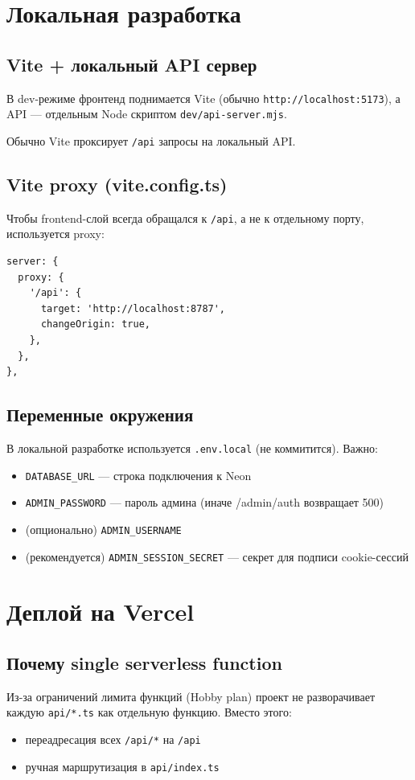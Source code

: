 \documentclass[12pt,a4paper]{article}
\begin{document}
\section{Локальная разработка}
\subsection{Vite + локальный API сервер}
В dev-режиме фронтенд поднимается Vite (обычно \texttt{http://localhost:5173}), а API --- отдельным Node скриптом \texttt{dev/api-server.mjs}.

Обычно Vite проксирует \texttt{/api} запросы на локальный API.

\subsection{Vite proxy (vite.config.ts)}
Чтобы frontend-слой всегда обращался к \texttt{/api}, а не к отдельному порту, используется proxy:
\begin{verbatim}
server: {
  proxy: {
    '/api': {
      target: 'http://localhost:8787',
      changeOrigin: true,
    },
  },
},
\end{verbatim}

\subsection{Переменные окружения}
В локальной разработке используется \texttt{.env.local} (не коммитится). Важно:
\begin{itemize}[leftmargin=18pt]
  \item \texttt{DATABASE\_URL} --- строка подключения к Neon
  \item \texttt{ADMIN\_PASSWORD} --- пароль админа (иначе /admin/auth возвращает 500)
  \item (опционально) \texttt{ADMIN\_USERNAME}
  \item (рекомендуется) \texttt{ADMIN\_SESSION\_SECRET} --- секрет для подписи cookie-сессий
\end{itemize}

\section{Деплой на Vercel}
\subsection{Почему single serverless function}
Из-за ограничений лимита функций (Hobby plan) проект не разворачивает каждую \texttt{api/*.ts} как отдельную функцию. Вместо этого:
\begin{itemize}[leftmargin=18pt]
  \item переадресация всех \texttt{/api/*} на \texttt{/api}
  \item ручная маршрутизация в \texttt{api/index.ts}
\end{itemize}
\end{document}
